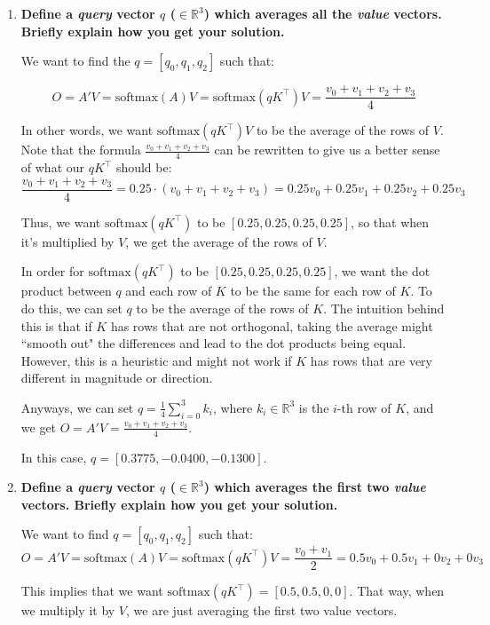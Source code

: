 \documentclass{article}
\begin{document}
\begin{enumerate}
    \item \textbf{Define a \textit{query} vector $q$ ($\in \mathbb{R}^{3}$)
    which averages all the \textit{value} vectors. Briefly explain how you get
    your solution.}

    We want to find the $q = [q_0, q_1, q_2]$ such that:

    $$O = A' V = \text{softmax}(A) V = \text{softmax} (q K^\top) V = \frac{v_0 +
    v_1 + v_2 + v_3}{4}$$

    In other words, we want $\text{softmax}(q K^\top) V$ to be the average of
    the rows of $V$. Note that the formula $\frac{v_0 + v_1 + v_2 + v_3}{4}$ can
    be rewritten to give us a better sense of what our $q K^\top$ should be:
    $$\frac{v_0 + v_1 + v_2 + v_3}{4} = 0.25 \cdot (v_0 + v_1 + v_2 + v_3) =
    0.25 v_0 + 0.25 v_1 + 0.25 v_2 + 0.25 v_3$$

    Thus, we want $\text{softmax}(q K^\top)$ to be $[0.25, 0.25, 0.25, 0.25]$,
    so that when it's multiplied by $V$, we get the average of the rows of $V$.

    In order for $\text{softmax}(q K^\top)$ to be $[0.25, 0.25, 0.25, 0.25]$, we
    want the dot product between $q$ and each row of $K$ to be the same for each
    row of $K$. To do this, we can set $q$ to be the average of the rows of $K$.
    The intuition behind this is that if $K$ has rows that are not orthogonal,
    taking the average might ``smooth out" the differences and lead to the dot
    products being equal. However, this is a heuristic and might not work if $K$
    has rows that are very different in magnitude or direction.
    
    Anyways, we can set $\boxed{q = \frac{1}{4} \sum_{i=0}^{3} k_i}$, where $k_i
    \in \mathbb{R}^{3}$ is the $i$-th row of $K$, and we get $O = A' V =
    \frac{v_0 + v_1 + v_2 + v_3}{4}$.

    In this case, $\boxed{q = [ 0.3775, -0.0400, -0.1300]}$.

    \item \textbf{Define a \textit{query} vector $q$ ($\in \mathbb{R}^{3}$)
    which averages the first two \textit{value} vectors. Briefly explain how you
    get your solution.}

    We want to find $q = [q_0, q_1, q_2]$ such that:
    $$O = A' V = \text{softmax}(A) V = \text{softmax}(q K^\top) V = \frac{v_0 +
    v_1}{2} = 0.5 v_0 + 0.5 v_1 + 0 v_2 + 0 v_3$$

    This implies that we want $\text{softmax}(q K^\top) = [0.5, 0.5, 0, 0]$.
    That way, when we multiply it by $V$, we are just averaging the first two
    value vectors.


\end{enumerate}
\end{document}
